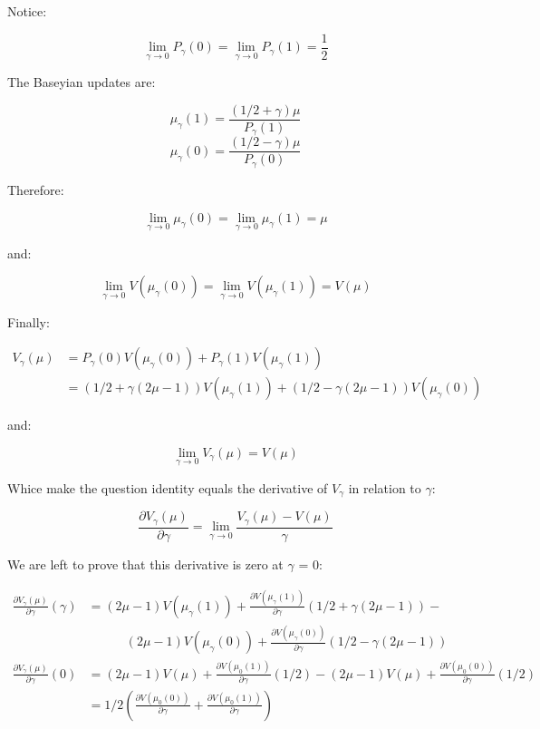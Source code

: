 \documentclass{article}
\begin{document}
Notice:

\[
  \lim_{\gamma \to 0} P_{\gamma}(0) = \lim_{\gamma \to 0} P_{\gamma}(1) = \frac{1}{2}
\]

The Baseyian updates are:

\[
  \mu_\gamma(1) = \frac{(1/2 + \gamma)\mu}{P_\gamma(1)}
\]
\[
  \mu_\gamma(0) = \frac{(1/2 - \gamma)\mu}{P_\gamma(0)}
\]

Therefore:

\[
  \lim_{\gamma \to 0} \mu_\gamma(0) = \lim_{\gamma \to 0} \mu_\gamma(1) = \mu
\]

and:

\[
  \lim_{\gamma \to 0} V(\mu_\gamma(0)) = \lim_{\gamma \to 0} V(\mu_\gamma(1)) = V(\mu)
\]



Finally:

\[
\begin{split}
  V_\gamma(\mu) & = P_\gamma(0)V(\mu_\gamma(0)) + P_\gamma(1)V(\mu_\gamma(1)) \\
                & = (1/2 + \gamma(2\mu -1))V(\mu_\gamma(1)) +
                    (1/2 - \gamma(2\mu -1))V(\mu_\gamma(0))
\end{split}
\]

and:

\[
  \lim_{\gamma \to 0} V_\gamma(\mu) = V(\mu)
\]

Whice make the question identity equals the derivative of $V_\gamma$ in relation
to $\gamma$:

\[
\frac{\partial V_\gamma(\mu)}{\partial \gamma} =
\lim_{\gamma \to 0} \frac{V_\gamma(\mu) - V(\mu)}{\gamma}
\]

We are left to prove that this derivative is zero at $\gamma$ = 0:

\[
\begin{split}
  \frac{\partial V_\gamma(\mu)}{\partial \gamma}(\gamma) & =
    (2\mu -1)V(\mu_\gamma(1)) +
    \frac{\partial V(\mu_\gamma(1))}{\partial \gamma}(1/2 + \gamma(2\mu - 1)) - \\
    & \qquad\quad
    (2\mu -1)V(\mu_\gamma(0)) +
    \frac{\partial V(\mu_\gamma(0))}{\partial \gamma}(1/2 - \gamma(2\mu - 1)) \\
  \frac{\partial V_\gamma(\mu)}{\partial \gamma}(0) & =
    (2\mu -1)V(\mu) +
    \frac{\partial V(\mu_0(1))}{\partial \gamma}(1/2) -
    (2\mu -1)V(\mu) +
    \frac{\partial V(\mu_0(0))}{\partial \gamma}(1/2) \\
  & =
    1/2 \left(\frac{\partial V(\mu_0(0))}{\partial \gamma} +
      \frac{\partial V(\mu_0(1))}{\partial \gamma}\right)
\end{split}
\]
\end{document}
